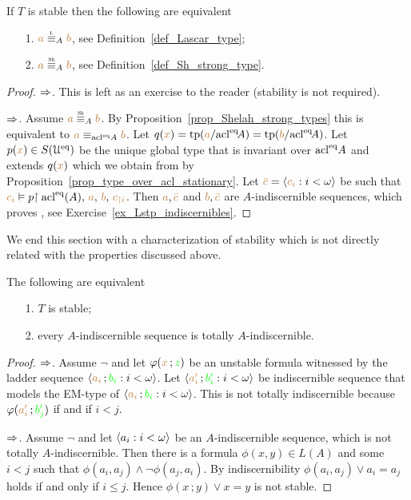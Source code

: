\documentclass[creche.tex]{subfiles}
\begin{document}
\begin{corollary}
If $T$ is stable then the following are equivalent
\begin{itemize}
\item[1.] ${\mr a}\equivL_A{\mr b}$, see Definition~\ref{def_Lascar_type};
\item[2.] ${\mr a}\equivSh_A{\mr b}$, see Definition~\ref{def_Sh_strong_type}.
\end{itemize}
\end{corollary}
\begin{proof}$\Rightarrow$.
  This is left as an exercise to the reader (stability is not required).

  $\Rightarrow$.
  Assume ${\mr a}\equivSh_A{\mr b}$.
  By Proposition~\ref{prop_Shelah_strong_types} this is equivalent to ${\color{brown} a}\equiv_{\mathop{\rm acl}^{{\rm eq}}\!A}{\color{brown} b}$.
  Let $q({\color{brown} x})={\rm tp}({\color{brown} a}/{\mathop{\rm acl}}^{{\rm eq}}\!A)={\rm tp}({\color{brown} b}/{\mathop{\rm acl}}^{{\rm eq}}\!A)$. Let $p({\color{brown} x})\in S(\EuScript U^{{\rm eq}})$ be the unique global type that is invariant over $\mathop{\rm acl}^{{\rm eq}}\! A$ and extends $q({\color{brown} x})$ which we obtain from by Proposition~\ref{prop_type_over_acl_stationary}.
  Let ${\color{brown}\bar c}=\langle{\color{brown}c_i}:i<\omega\rangle$ be such that ${\color{brown} c_i}\vDash p{\restriction \mathop{\rm acl}^{{\rm eq}}(A),\,{\color{brown} a},\,{\color{brown} b},\,{\color{brown} c_{\restriction i}}}$.
  Then ${\color{brown} a},{\color{brown}\bar c}$ and ${\color{brown} b},{\color{brown}\bar c}$ are $A$-indiscernible sequences, which proves , see Exercise~\ref{ex_Lstp_indiscernibles}.
\end{proof}

We end this section with a characterization of stability which is not directly related with the properties discussed above. 

\begin{proposition} The following are equivalent
\begin{itemize}
\item[1.] $T$ is stable;
\item[2.] every $A$-indiscernible sequence is totally $A$-indiscernible.
\end{itemize}
\end{proposition}

\begin{proof}
$\Rightarrow$. Assume $\neg$ and let $\varphi({\color{brown} x}\,;{\color{green} z})$ be an unstable formula witnessed by the ladder sequence $\langle{\color{brown}a_i}\,;{\color{green} b_i}:i<\omega\rangle$. Let $\langle{\color{brown}a'_i}\,;{\color{green} b'_i} : i<\omega\rangle$ be 
indiscernible sequence that models the EM-type of $\langle{\color{brown}a_i}\,;{\color{green} b_i} : i<\omega\rangle$. This is not totally indiscernible because $\varphi({\color{brown} a'_i}\,;{\color{green} b'_j})$ if and if $i< j$.

$\Rightarrow$. Assume $\neg$ and let $\langle a_i : i<\omega\rangle$ be an $A$-indiscernible sequence, which is not totally $A$-in\-dis\-cern\-ible. Then there is a formula $\phi(x, y)\in L(A)$ and some $i<j$ such that $\phi(a_i , a_j )\wedge\neg\phi(a_j , a_i) $. By indiscernibility  $\phi(a_i, a_j)\vee a_i=a_j$ holds if and only if $i\le j$. Hence $\phi(x\,; y)\vee x=y$ is not stable.
\end{proof}
\end{document}
